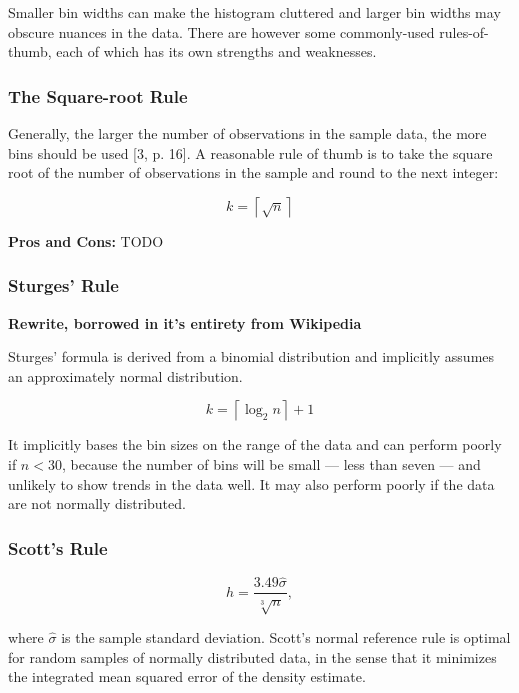Smaller bin widths can make the histogram cluttered and larger bin widths may obscure nuances in the data. There are however some commonly-used rules-of-thumb, each of which has its own strengths and weaknesses. 

\subsubsection*{The Square-root Rule}

Generally, the larger the number of observations in the sample data, the more bins should be used [3, p. 16]. A reasonable rule of thumb is to take the square root of the number of observations in the sample and round to the next integer:

\begin{equation}
    k = \left \lceil \sqrt{n} \right \rceil 
\end{equation}

\textbf{Pros and Cons:} TODO

\subsubsection{Sturges' Rule}

\textbf{Rewrite, borrowed in it's entirety from Wikipedia}

Sturges' formula is derived from a binomial distribution and implicitly assumes an approximately normal distribution.

\begin{equation}
    k = \left \lceil \log_2 n \right \rceil + 1 
\end{equation}

It implicitly bases the bin sizes on the range of the data and can perform poorly if $n < 30$, because the number of bins will be small — less than seven — and unlikely to show trends in the data well. It may also perform poorly if the data are not normally distributed.

\subsubsection{Scott's Rule}

\begin{equation}
    h = \frac{3.49 \hat{\sigma}}{\sqrt[3]{n}},
\end{equation}

where $\hat{\sigma}$ is the sample standard deviation. Scott's normal reference rule is optimal for random samples of normally distributed data, in the sense that it minimizes the integrated mean squared error of the density estimate. 

